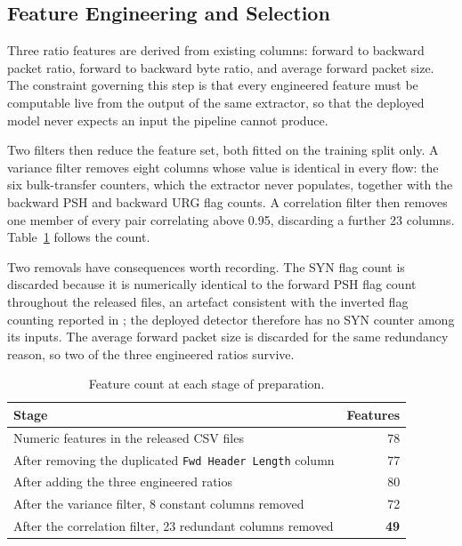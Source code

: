 \documentclass[runningheads]{llncs}
\begin{document}
\subsection{Feature Engineering and Selection}

Three ratio features are derived from existing columns: forward to backward packet ratio, forward to backward byte ratio, and average forward packet size. The constraint governing this step is that every engineered feature must be computable live from the output of the same extractor, so that the deployed model never expects an input the pipeline cannot produce.

Two filters then reduce the feature set, both fitted on the training split only. A variance filter removes eight columns whose value is identical in every flow: the six bulk-transfer counters, which the extractor never populates, together with the backward PSH and backward URG flag counts. A correlation filter then removes one member of every pair correlating above 0.95, discarding a further 23 columns. Table~\ref{tab:features} follows the count.

Two removals have consequences worth recording. The SYN flag count is discarded because it is numerically identical to the forward PSH flag count throughout the released files, an artefact consistent with the inverted flag counting reported in \cite{rosay2022comprehensive}; the deployed detector therefore has no SYN counter among its inputs. The average forward packet size is discarded for the same redundancy reason, so two of the three engineered ratios survive.

\begin{table}[t]
\centering
\caption{Feature count at each stage of preparation.}
\label{tab:features}
\begin{tabular}{lr}
\toprule
\textbf{Stage} & \textbf{Features} \\
\midrule
Numeric features in the released CSV files                    & 78 \\
After removing the duplicated \texttt{Fwd Header Length} column & 77 \\
After adding the three engineered ratios                      & 80 \\
After the variance filter, 8 constant columns removed         & 72 \\
After the correlation filter, 23 redundant columns removed    & \textbf{49} \\
\bottomrule
\end{tabular}
\end{table}
\end{document}
